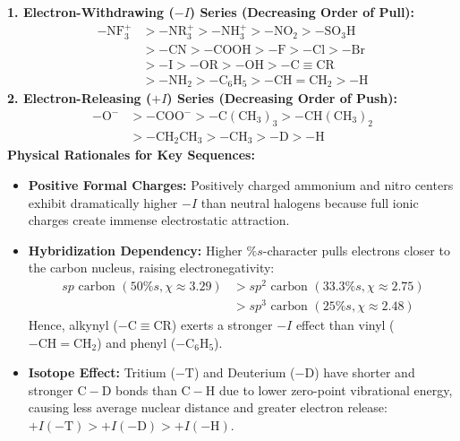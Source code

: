 \documentclass[10pt,twoside,openright]{book}
\begin{document}
\begin{formulabox}
\textbf{1. Electron-Withdrawing ($-I$) Series (Decreasing Order of Pull):}
\begin{align}
  -\mathrm{NF_3^+} &> -\mathrm{NR_3^+} > -\mathrm{NH_3^+} > -\mathrm{NO_2} > -\mathrm{SO_3H} \\
  &> -\mathrm{CN} > -\mathrm{COOH} > -\mathrm{F} > -\mathrm{Cl} > -\mathrm{Br} \\
  &> -\mathrm{I} > -\mathrm{OR} > -\mathrm{OH} > -\mathrm{C\equiv CR} \\
  &> -\mathrm{NH_2} > -\mathrm{C_6H_5} > -\mathrm{CH=CH_2} > -\mathrm{H}
\end{align}
\textbf{2. Electron-Releasing ($+I$) Series (Decreasing Order of Push):}
\begin{align}
  -\mathrm{O^-} &> -\mathrm{COO^-} > -\mathrm{C(CH_3)_3} > -\mathrm{CH(CH_3)_2} \\
  &> -\mathrm{CH_2CH_3} > -\mathrm{CH_3} > -\mathrm{D} > -\mathrm{H}
\end{align}
\textbf{Physical Rationales for Key Sequences:}
\begin{itemize}
  \item \textbf{Positive Formal Charges:} Positively charged ammonium and nitro centers exhibit dramatically higher $-I$ than neutral halogens because full ionic charges create immense electrostatic attraction.
  \item \textbf{Hybridization Dependency:} Higher $\% s$-character pulls electrons closer to the carbon nucleus, raising electronegativity:
  \begin{align}
    sp\text{ carbon } (50\% s, \chi \approx 3.29) &> sp^2\text{ carbon } (33.3\% s, \chi \approx 2.75) \\
    &> sp^3\text{ carbon } (25\% s, \chi \approx 2.48)
  \end{align}
  Hence, alkynyl ($-\mathrm{C\equiv CR}$) exerts a stronger $-I$ effect than vinyl ($-\mathrm{CH=CH_2}$) and phenyl ($-\mathrm{C_6H_5}$).
  \item \textbf{Isotope Effect:} Tritium ($-\mathrm{T}$) and Deuterium ($-\mathrm{D}$) have shorter and stronger $\mathrm{C-D}$ bonds than $\mathrm{C-H}$ due to lower zero-point vibrational energy, causing less average nuclear distance and greater electron release: $+I(\mathrm{-T}) > +I(\mathrm{-D}) > +I(\mathrm{-H})$.
\end{itemize}
\end{formulabox}
\end{document}
